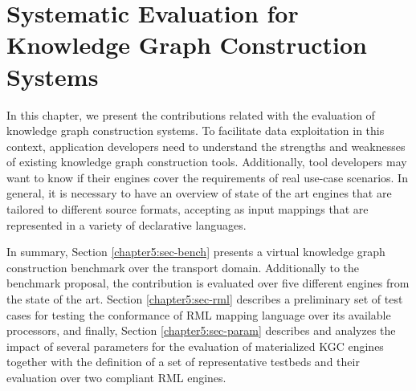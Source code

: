 \chapter{Systematic Evaluation for Knowledge Graph Construction Systems}
\label{chapter:evaluation}



In this chapter, we present the contributions related with the evaluation of knowledge graph construction systems. To facilitate data exploitation in this context, application developers need to understand the strengths and weaknesses of existing knowledge graph construction tools. Additionally, tool developers may want to know if their engines cover the requirements of real use-case scenarios. In general, it is necessary to have an overview of state of the art engines that are tailored to different source formats, accepting as input mappings that are represented in a variety of declarative languages. 

In summary, Section \ref{chapter5:sec-bench} presents a virtual knowledge graph construction benchmark over the transport domain. Additionally to the benchmark proposal, the contribution is evaluated over five different engines from the state of the art. Section \ref{chapter5:sec-rml} describes a preliminary set of test cases for testing the conformance of RML mapping language over its available processors, and finally, Section \ref{chapter5:sec-param} describes and analyzes the impact of several parameters for the evaluation of materialized KGC engines together with the definition of a set of representative testbeds and their evaluation over two compliant RML engines.







